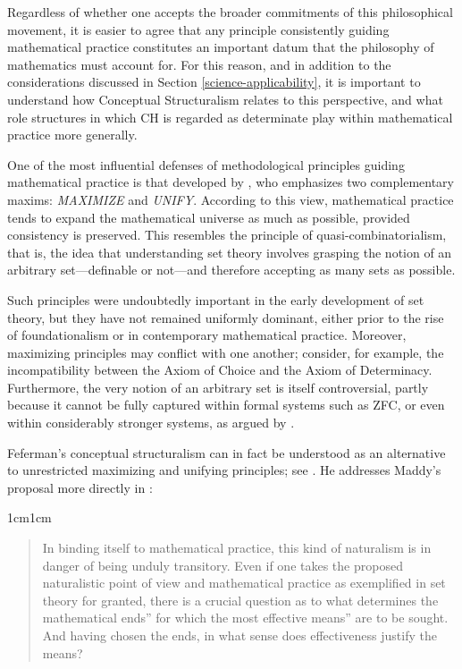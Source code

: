 \documentclass[11pt,a4paper]{book}
\theoremstyle{plain}
\begin{document}
Regardless of whether one accepts the broader commitments of this philosophical movement, it is easier to agree that any principle consistently guiding mathematical practice constitutes an important datum that the philosophy of mathematics must account for. For this reason, and in addition to the considerations discussed in Section \ref{science-applicability}, it is important to understand how Conceptual Structuralism relates to this perspective, and what role structures in which CH is regarded as determinate play within mathematical practice more generally.

One of the most influential defenses of methodological principles guiding mathematical practice is that developed by \textcite{Maddy1997}, who emphasizes two complementary maxims: \emph{MAXIMIZE} and \emph{UNIFY}. According to this view, mathematical practice tends to expand the mathematical universe as much as possible, provided consistency is preserved. This resembles the principle of quasi-combinatorialism, that is, the idea that understanding set theory involves grasping the notion of an arbitrary set—definable or not—and therefore accepting as many sets as possible.

Such principles were undoubtedly important in the early development of set theory, but they have not remained uniformly dominant, either prior to the rise of foundationalism or in contemporary mathematical practice. Moreover, maximizing principles may conflict with one another; consider, for example, the incompatibility between the Axiom of Choice and the Axiom of Determinacy. Furthermore, the very notion of an arbitrary set is itself controversial, partly because it cannot be fully captured within formal systems such as ZFC, or even within considerably stronger systems, as argued by \textcite{Ferreiros2011}.

Feferman's conceptual structuralism can in fact be understood as an alternative to unrestricted maximizing and unifying principles; see \parencite[p.~9]{Feferman2011a}. He addresses Maddy's proposal more directly in \textcite[p.~9]{Feferman2000NewAxioms}:

\begin{adjustwidth}{1cm}{1cm}
\small
\begin{quote}
In binding itself to mathematical practice, this kind of naturalism is in danger of being unduly transitory. Even if one takes the proposed naturalistic point of view and mathematical practice as exemplified in set theory for granted, there is a crucial question as to what determines the mathematical ends'' for which the most effective means'' are to be sought. And having chosen the ends, in what sense does effectiveness justify the means?
\end{quote}
\end{adjustwidth}
\end{document}
